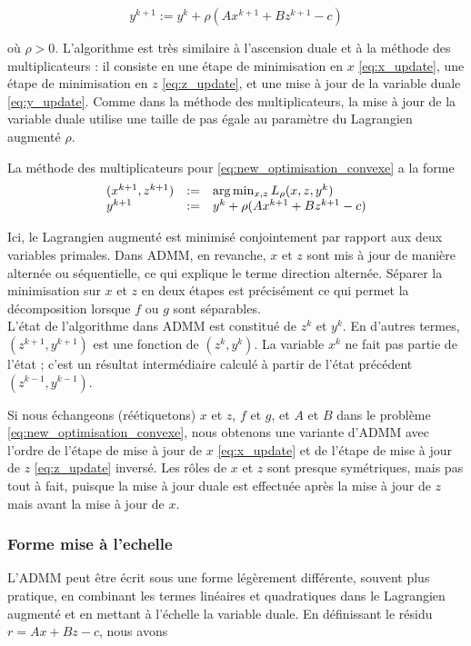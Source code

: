 \begin{equation}
    y^{k+1} := y^k + \rho(Ax^{k+1} + Bz^{k+1} - c)
    \label{eq:y_update}
\end{equation}

où \(\rho > 0\). L'algorithme est très similaire à l'ascension duale et à la méthode des multiplicateurs : il consiste en une étape de minimisation en \(x\) \eqref{eq:x_update}, une étape de minimisation en \(z\) \eqref{eq:z_update}, et une mise à jour de la variable duale \eqref{eq:y_update}. Comme dans la méthode des multiplicateurs, la mise à jour de la variable duale utilise une taille de pas égale au paramètre du Lagrangien augmenté \(\rho\).

La méthode des multiplicateurs pour \eqref{eq:new_optimisation_convexe} a la forme
\begin{equation}
    \begin{array}{l l l}
        (x^{k+1}, z^{k+1}) &:=& \arg\min_{x,z} L_\rho(x, z, y^k)\\
        y^{k+1} &:=& y^k + \rho(Ax^{k+1} + Bz^{k+1} - c)
    \end{array}
\end{equation}

Ici, le Lagrangien augmenté est minimisé conjointement par rapport aux deux variables primales. Dans ADMM, en revanche, \(x\) et \(z\) sont mis à jour de manière alternée ou séquentielle, ce qui explique le terme direction alternée. Séparer la minimisation sur \(x\) et \(z\) en deux étapes est précisément ce qui permet la décomposition lorsque \(f\) ou \(g\) sont séparables.\\
L'état de l'algorithme dans ADMM est constitué de \(z^k\) et \(y^k\). En d'autres termes, \((z^{k+1}, y^{k+1})\) est une fonction de \((z^k, y^k)\). La variable \(x^k\) ne fait pas partie de l'état ; c'est un résultat intermédiaire calculé à partir de l'état précédent \((z^{k-1}, y^{k-1})\).

Si nous échangeons (réétiquetons) \(x\) et \(z\), \(f\) et \(g\), et \(A\) et \(B\) dans le problème \eqref{eq:new_optimisation_convexe}, nous obtenons une variante d'ADMM avec l'ordre de l'étape de mise à jour de \(x\) \eqref{eq:x_update} et de l'étape de mise à jour de \(z\) \eqref{eq:z_update} inversé. Les rôles de \(x\) et \(z\) sont presque symétriques, mais pas tout à fait, puisque la mise à jour duale est effectuée après la mise à jour de \(z\) mais avant la mise à jour de \(x\).


\subsubsection{Forme mise à l'echelle}
L'ADMM peut être écrit sous une forme légèrement différente, souvent plus pratique, en combinant les termes linéaires et quadratiques dans le Lagrangien augmenté et en mettant à l'échelle la variable duale. En définissant le résidu \( r = Ax + Bz - c \), nous avons

